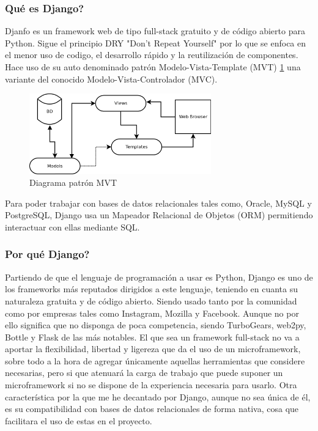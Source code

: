 \subsubsection{Qué es Django?}
Djanfo es un framework web de tipo full-stack gratuito y de código abierto para Python. Sigue el principio DRY "Don’t Repeat Yourself" por lo que se enfoca en el menor uso de codigo, el desarrollo rápido y la reutilización de componentes. \cite{DjDF} \cite{alchin2013pro}
\newline
\newline
Hace uso de su auto denominado patrón Modelo-Vista-Template (MVT) \ref{fig:ej1} una variante del conocido Modelo-Vista-Controlador (MVC). \cite{ravindran2015django}
\newline
\begin{figure} [h!]
	\centering
	\includegraphics[width=0.7\textwidth]{fig/DjangoMVT.png}
	\caption[Diagrama patrón MVT]{Diagrama patrón MVT \footnotemark}
	\label{fig:ej1}
\end{figure}
\newline
Para poder trabajar con bases de datos relacionales tales como, Oracle, MySQL y PostgreSQL, Django usa un Mapeador Relacional de Objetos (ORM) permitiendo interactuar con ellas mediante SQL.

\newpage

\subsubsection{Por qué Django?}
Partiendo de que el lenguaje de programación a usar es Python, Django es uno de los frameworks más reputados dirigidos a este lenguaje, teniendo en cuanta su naturaleza gratuita y de código abierto. Siendo usado tanto por la comunidad como por empresas tales como Instagram, Mozilla y Facebook. Aunque no por ello significa que no disponga de poca competencia, siendo TurboGears, web2py, Bottle y Flask de las más notables.
\newline
\newline
El que sea un framework full-stack no va a aportar la flexibilidad, libertad y ligereza que da el uso de un microframework, sobre todo a la hora de agregar únicamente aquellas herramientas que considere necesarias, pero si que atenuará la carga de trabajo que puede suponer un microframework si no se dispone de la experiencia necesaria para usarlo.
\newline
\newline
Otra característica por la que me he decantado por Django, aunque no sea única de él, es su compatibilidad con bases de datos relacionales de forma nativa, cosa que facilitara el uso de estas en el proyecto.

